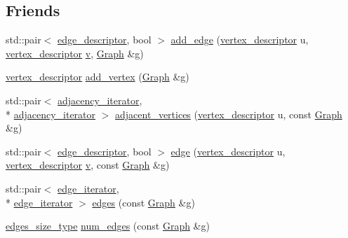 \subsection*{Friends}
\begin{DoxyCompactItemize}
\item 
std\-::pair$<$ \hyperlink{classGraph_ab641b227e6d3e56c3340cda156fc2bad}{edge\-\_\-descriptor}, bool $>$ \hyperlink{classGraph_a21aaff00ca2ef2f86932f4f4803adbd9}{add\-\_\-edge} (\hyperlink{classGraph_a9b97d75f995b7c1cb0b5760690bef3ba}{vertex\-\_\-descriptor} u, \hyperlink{classGraph_a9b97d75f995b7c1cb0b5760690bef3ba}{vertex\-\_\-descriptor} \hyperlink{classGraph_aa9654a924fa25bf3ee9e05b088c294ec}{v}, \hyperlink{classGraph}{Graph} \&g)
\item 
\hyperlink{classGraph_a9b97d75f995b7c1cb0b5760690bef3ba}{vertex\-\_\-descriptor} \hyperlink{classGraph_a460812cc36de1f018d533425648cd957}{add\-\_\-vertex} (\hyperlink{classGraph}{Graph} \&g)
\item 
std\-::pair$<$ \hyperlink{classGraph_ad03c07358f7be9768eba3825f75ded45}{adjacency\-\_\-iterator}, \\*
\hyperlink{classGraph_ad03c07358f7be9768eba3825f75ded45}{adjacency\-\_\-iterator} $>$ \hyperlink{classGraph_af41d11d36c2cb55b3603fd1a1417d1e2}{adjacent\-\_\-vertices} (\hyperlink{classGraph_a9b97d75f995b7c1cb0b5760690bef3ba}{vertex\-\_\-descriptor} u, const \hyperlink{classGraph}{Graph} \&g)
\item 
std\-::pair$<$ \hyperlink{classGraph_ab641b227e6d3e56c3340cda156fc2bad}{edge\-\_\-descriptor}, bool $>$ \hyperlink{classGraph_ac71261875661196767a4727426720e87}{edge} (\hyperlink{classGraph_a9b97d75f995b7c1cb0b5760690bef3ba}{vertex\-\_\-descriptor} u, \hyperlink{classGraph_a9b97d75f995b7c1cb0b5760690bef3ba}{vertex\-\_\-descriptor} \hyperlink{classGraph_aa9654a924fa25bf3ee9e05b088c294ec}{v}, const \hyperlink{classGraph}{Graph} \&g)
\item 
std\-::pair$<$ \hyperlink{classGraph_a1082e7f0c0beefee6a7950e951a081f6}{edge\-\_\-iterator}, \\*
\hyperlink{classGraph_a1082e7f0c0beefee6a7950e951a081f6}{edge\-\_\-iterator} $>$ \hyperlink{classGraph_a9d595e6a5ba50cc48612a97ebb08c423}{edges} (const \hyperlink{classGraph}{Graph} \&g)
\item 
\hyperlink{classGraph_a1924745b438f862ba9aa7cd0ff5b7da5}{edges\-\_\-size\-\_\-type} \hyperlink{classGraph_a8762ff8f5b09fea3fdcfb92c2648336e}{num\-\_\-edges} (const \hyperlink{classGraph}{Graph} \&g)
\item 

\end{DoxyCompactItemize}
